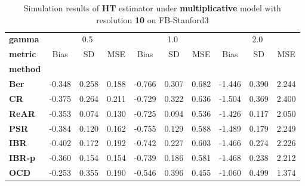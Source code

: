 \begin{table}
\centering
\caption{Simulation results of \textbf{HT} estimator under \textbf{multiplicative} model with resolution \textbf{10} on FB-Stanford3}
\begin{tabular}{lccccccccc}
\toprule
\textbf{gamma} & \multicolumn{3}{c}{0.5} & \multicolumn{3}{c}{1.0} & \multicolumn{3}{c}{2.0} \\
\textbf{metric} &   Bias &     SD &    MSE &   Bias &     SD &    MSE &   Bias &     SD &    MSE \\
\textbf{method} &        &        &        &        &        &        &        &        &        \\
\midrule
\textbf{Ber} & -0.348 &  0.258 &  0.188 & -0.766 &  0.307 &  0.682 & -1.446 &  0.390 &  2.244 \\
\textbf{CR} & -0.375 &  0.264 &  0.211 & -0.729 &  0.322 &  0.636 & -1.504 &  0.369 &  2.400 \\
\textbf{ReAR} & -0.353 &  0.074 &  0.130 & -0.725 &  0.094 &  0.536 & -1.426 &  0.117 &  2.050 \\
\textbf{PSR} & -0.384 &  0.120 &  0.162 & -0.755 &  0.129 &  0.588 & -1.489 &  0.179 &  2.249 \\
\textbf{IBR} & -0.402 &  0.172 &  0.192 & -0.742 &  0.227 &  0.603 & -1.466 &  0.274 &  2.226 \\
\textbf{IBR-p} & -0.360 &  0.154 &  0.154 & -0.739 &  0.186 &  0.581 & -1.468 &  0.238 &  2.212 \\
\textbf{OCD} & -0.253 &  0.355 &  0.190 & -0.546 &  0.396 &  0.455 & -1.060 &  0.499 &  1.374 \\
\bottomrule
\end{tabular}
\end{table}
